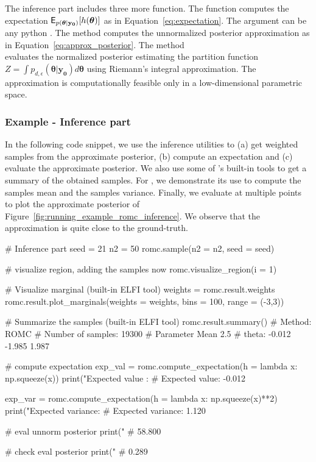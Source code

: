 \documentclass[nojss]{jss}
\newcommand{\thetab}{\boldsymbol{\theta}}
\newcommand{\data}{\mathbf{y_0}}
\begin{document}
\noindent
The inference part includes three more function. The function
 computes the expectation
\(\E_{p(\thetab|\data)}[h(\thetab)]\) as in
Equation~\ref{eq:expectation}. The argument  can be any python
. The method  computes the unnormalized posterior
approximation as in Equation~\ref{eq:approx_posterior}. The method \\
 evaluates the
normalized posterior estimating the partition function
\(Z = \int p_{d,\epsilon}(\thetab|\data)d\thetab\) using Riemann's
integral approximation. The approximation is computationally feasible
only in a low-dimensional parametric space.

\subsubsection*{Example - Inference part}

In the following code snippet, we use the inference utilities to (a)
get weighted samples from the approximate posterior, (b) compute an
expectation and (c) evaluate the approximate posterior. We also use
some of 's built-in tools to get a summary of the obtained
samples. For , we demonstrate its use
to compute the samples mean and the samples variance. Finally, we
evaluate  at multiple points to plot the
approximate posterior of
Figure~\ref{fig:running_example_romc_inference}. We observe that the
approximation is quite close to the ground-truth.

\begin{Code}
# Inference part
seed = 21
n2 = 50
romc.sample(n2 = n2, seed = seed)

# visualize region, adding the samples now
romc.visualize_region(i = 1)

# Visualize marginal (built-in ELFI tool)
weights = romc.result.weights
romc.result.plot_marginals(weights = weights, bins = 100, range = (-3,3))

# Summarize the samples (built-in ELFI tool)
romc.result.summary()
# Method: ROMC
# Number of samples: 19300
# Parameter                Mean               2.5%
# theta:                 -0.012             -1.985              1.987

# compute expectation
exp_val = romc.compute_expectation(h = lambda x: np.squeeze(x))
print("Expected value   : %
# Expected value: -0.012

exp_var = romc.compute_expectation(h = lambda x: np.squeeze(x)**2)
print("Expected variance: %
# Expected variance: 1.120

# eval unnorm posterior
print("%
# 58.800

# check eval posterior
print("%
# 0.289
\end{Code}
\end{document}
